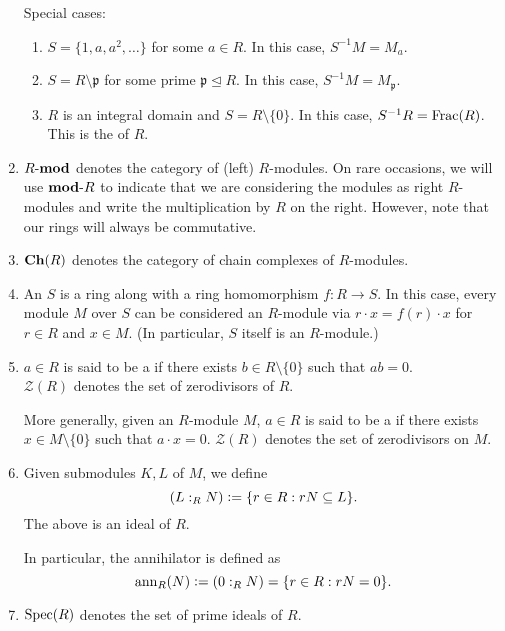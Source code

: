 \begin{enumerate}
	Special cases: 
	\begin{enumerate}
		\item $S = \{1, a, a^{2}, \ldots\}$ for some $a \in R$. In this case, $S^{-1}M = M_{a}$.
		\item $S = R \setminus \mathfrak{p}$ for some prime $\mathfrak{p} \unlhd R$. In this case, $S^{-1}M = M_{\mathfrak{p}}$.
		\item $R$ is an integral domain and $S = R \setminus \{0\}$. In this case, $S^{-1}R = \Frac(R)$. This is the  of $R$.
	\end{enumerate}
	\item $\lmod{R}$ denotes the category of (left) $R$-modules. On rare occasions, we will use $\rmod{R}$ to indicate that we are considering the modules as right $R$-modules and write the multiplication by $R$ on the right. However, note that our rings will always be commutative.
	\item $\Ch{R}$ denotes the category of chain complexes of $R$-modules.
	\item An  $S$ is a ring along with a ring homomorphism $f : R \to S$. \newline
	In this case, every module $M$ over $S$ can be considered an $R$-module via $r \cdot x = f(r) \cdot x$ for $r \in R$ and $x \in M$. (In particular, $S$ itself is an $R$-module.)
	\item $a \in R$ is said to be a  if there exists $b \in R \setminus \{0\}$ such that $ab = 0$. \\
	$\mathcal{Z}(R)$ denotes the set of zerodivisors of $R$. 

	More generally, given an $R$-module $M$, $a \in R$ is said to be a  if there exists $x \in M \setminus \{0\}$ such that $a \cdot x = 0$. \newline
	$\mathcal{Z}(R)$ denotes the set of zerodivisors on $M$. 	
	\item Given submodules $K, L$ of $M$, we define
	\begin{equation*} 
		(L :_{R} N) \vcentcolon= \{r \in R : rN \subset L\}.
	\end{equation*}
	The above is an ideal of $R$. 

	In particular, the annihilator is defined as
	\begin{equation*} 
		\ann_{R}(N) \vcentcolon= (0 :_{R} N) = \{r \in R : rN = 0\}.
	\end{equation*}
	\item $\Spec(R)$ denotes the set of prime ideals of $R$.
\end{enumerate}

